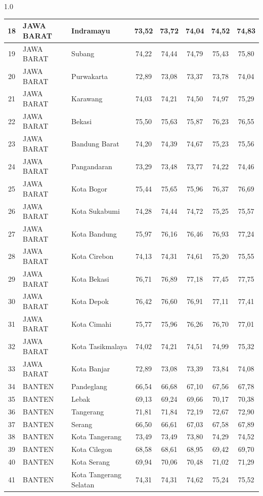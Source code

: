 \begin{spacing}{1.0}
\begin{longtable}{|c|p{2.2cm}|p{2.8cm}|c|c|c|c|c|}
18 & JAWA BARAT & Indramayu & 73,52 & 73,72 & 74,04 & 74,52 & 74,83 \\ \hline
19 & JAWA BARAT & Subang & 74,22 & 74,44 & 74,79 & 75,43 & 75,80 \\ \hline
20 & JAWA BARAT & Purwakarta & 72,89 & 73,08 & 73,37 & 73,78 & 74,04 \\ \hline
21 & JAWA BARAT & Karawang & 74,03 & 74,21 & 74,50 & 74,97 & 75,29 \\ \hline
22 & JAWA BARAT & Bekasi & 75,50 & 75,63 & 75,87 & 76,23 & 76,55 \\ \hline
23 & JAWA BARAT & Bandung Barat & 74,20 & 74,39 & 74,67 & 75,23 & 75,56 \\ \hline
24 & JAWA BARAT & Pangandaran & 73,29 & 73,48 & 73,77 & 74,22 & 74,46 \\ \hline
25 & JAWA BARAT & Kota Bogor & 75,44 & 75,65 & 75,96 & 76,37 & 76,69 \\ \hline
26 & JAWA BARAT & Kota Sukabumi & 74,28 & 74,44 & 74,72 & 75,25 & 75,57 \\ \hline
27 & JAWA BARAT & Kota Bandung & 75,97 & 76,16 & 76,46 & 76,93 & 77,24 \\ \hline
28 & JAWA BARAT & Kota Cirebon & 74,13 & 74,31 & 74,61 & 75,20 & 75,55 \\ \hline
29 & JAWA BARAT & Kota Bekasi & 76,71 & 76,89 & 77,18 & 77,45 & 77,75 \\ \hline
30 & JAWA BARAT & Kota Depok & 76,42 & 76,60 & 76,91 & 77,11 & 77,41 \\ \hline
31 & JAWA BARAT & Kota Cimahi & 75,77 & 75,96 & 76,26 & 76,70 & 77,01 \\ \hline
32 & JAWA BARAT & Kota Tasikmalaya & 74,02 & 74,21 & 74,51 & 74,99 & 75,32 \\ \hline
33 & JAWA BARAT & Kota Banjar & 72,89 & 73,08 & 73,39 & 73,84 & 74,08 \\ \hline
34 & BANTEN & Pandeglang & 66,54 & 66,68 & 67,10 & 67,56 & 67,78 \\ \hline
35 & BANTEN & Lebak & 69,13 & 69,24 & 69,66 & 70,17 & 70,38 \\ \hline
36 & BANTEN & Tangerang & 71,81 & 71,84 & 72,19 & 72,67 & 72,90 \\ \hline
37 & BANTEN & Serang & 66,50 & 66,61 & 67,03 & 67,58 & 67,89 \\ \hline
38 & BANTEN & Kota Tangerang & 73,49 & 73,49 & 73,80 & 74,29 & 74,52 \\ \hline
39 & BANTEN & Kota Cilegon & 68,58 & 68,61 & 68,95 & 69,42 & 69,70 \\ \hline
40 & BANTEN & Kota Serang & 69,94 & 70,06 & 70,48 & 71,02 & 71,29 \\ \hline
41 & BANTEN & Kota Tangerang Selatan & 74,31 & 74,31 & 74,62 & 75,24 & 75,52 \\ \hline
\end{longtable}
\end{spacing}
\newpage
